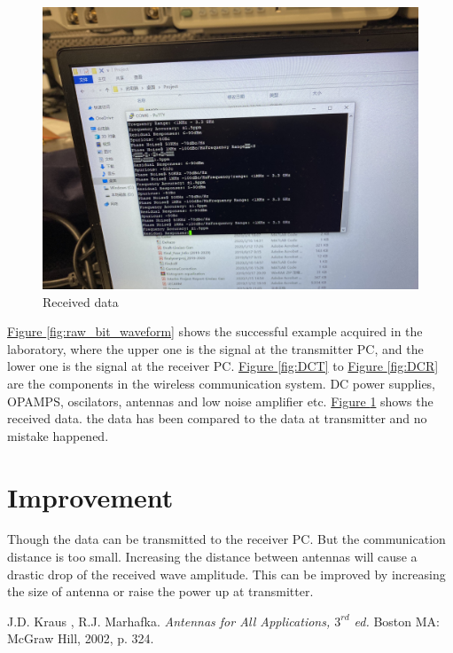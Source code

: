 \documentclass[12pt,a4paper]{report}
\begin{document}
\begin{figure}
    \centerline{\includegraphics[scale=0.1]{ReceiverPC.png}}
    \caption{Received data}
    \label{fig:DataR}
\end{figure}
\hyperref[fig:raw_bit_waveform]{Figure \ref*{fig:raw_bit_waveform}} shows the successful example acquired in the laboratory, where the upper one is the signal at the transmitter PC, and the lower one is the signal at the receiver PC.
\hyperref[fig:DCT]{Figure \ref*{fig:DCT}} to \hyperref[fig:DCR]{Figure \ref*{fig:DCR}} are the components in the wireless communication system. DC power supplies, OPAMPS, oscilators, antennas and low noise amplifier etc. 
\hyperref[fig:DataR]{Figure \ref*{fig:DataR}} shows the received data. the data has been compared to the data at transmitter and no mistake happened.
\section{Improvement}
Though the data can be transmitted to the receiver PC. But the communication distance is too small. Increasing the distance between antennas will cause a drastic drop of the received wave amplitude.
This can be improved by increasing the size of antenna or raise the power up at transmitter. 

\begin{thebibliography}{99}

    J.D. Kraus , R.J. Marhafka.
    \textit{Antennas for All Applications, $3^{rd}$ ed.}
    Boston MA: McGraw Hill, 2002, p. 324.


\end{thebibliography}
    
\end{document}
